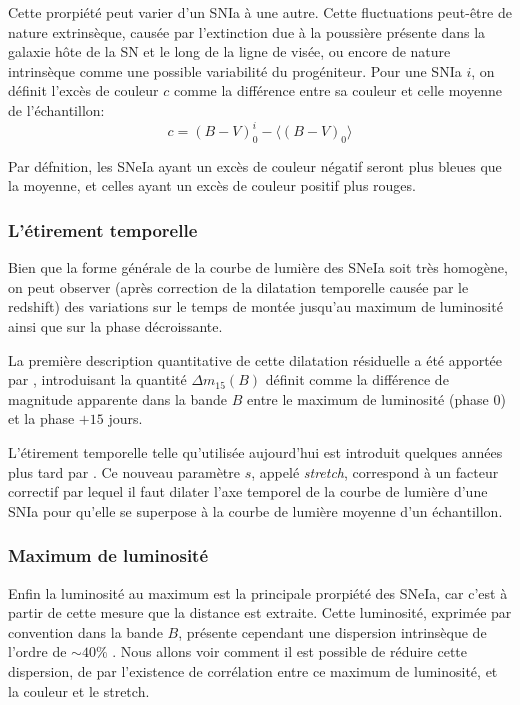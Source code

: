 \documentclass[../main/main.tex]{subfiles}
\begin{document}
Cette prorpiété peut varier d'un SNIa à une autre. Cette fluctuations
peut-être de nature extrinsèque, causée par l'extinction due à la
poussière présente dans la galaxie hôte de la SN et le long de la ligne
de visée, ou encore de nature intrinsèque comme une possible variabilité
du progéniteur.
Pour une SNIa $i$, on définit l'excès de couleur $c$ comme la différence
entre sa couleur et celle moyenne de l'échantillon:
\begin{equation}
  \label{eq:color}
  c=(B-V)^{i}_{0}-\langle(B-V)_{0}\rangle
\end{equation}

Par défnition, les SNeIa ayant un excès de couleur négatif seront plus
bleues que la moyenne, et celles ayant un excès de couleur positif plus
rouges.

\subsubsection*{L'étirement temporelle}

Bien que la forme générale de la courbe de lumière des SNeIa soit très
homogène, on peut observer (après correction de la dilatation temporelle
causée par le redshift) des variations sur le temps de montée
jusqu'au maximum de luminosité ainsi que sur la phase décroissante.

La première description quantitative de cette dilatation résiduelle a
été apportée par \citet{Phillips1993},
introduisant la quantité $\Delta m_{15}(B)$ définit comme la différence de
magnitude apparente dans la bande $B$ entre le maximum de luminosité
(phase $0$) et la phase $+15$ jours.

L'étirement temporelle telle qu'utilisée aujourd'hui est introduit
quelques années plus tard par \citet{Perlmutter1997}. Ce nouveau
paramètre $s$, appelé \textit{stretch}, correspond à un facteur
correctif par lequel il faut dilater l'axe temporel de la courbe de
lumière d'une SNIa pour qu'elle se superpose à la courbe de lumière
moyenne d'un échantillon.
\subsubsection*{Maximum de luminosité}

Enfin la luminosité au maximum est la principale prorpiété des SNeIa, car
c'est à partir de cette mesure que la distance est extraite. 
Cette luminosité, exprimée par convention dans la bande $B$, présente cependant une dispersion intrinsèque de
l'ordre de $\sim40\%$ \citep{Hamuy1996}. Nous allons voir comment il est
possible de réduire cette dispersion, de par l'existence de corrélation
entre ce maximum de luminosité, et la couleur et le stretch. 
\clearpage
\end{document}
